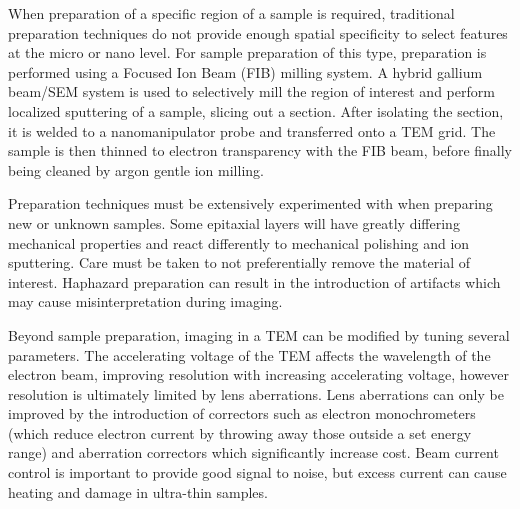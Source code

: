 When preparation of a specific region of a sample is required, traditional preparation techniques do not provide enough spatial specificity to select features at the micro or nano level.
For sample preparation of this type, preparation is performed using a Focused Ion Beam (FIB) milling system.
A hybrid gallium beam/SEM system is used to selectively mill the region of interest and perform localized sputtering of a sample, slicing out a section.
After isolating the section, it is welded to a nanomanipulator probe and transferred onto a TEM grid.
The sample is then thinned to electron transparency with the FIB beam, before finally being cleaned by argon gentle ion milling.

Preparation techniques must be extensively experimented with when preparing new or unknown samples.
Some epitaxial layers will have greatly differing mechanical properties and react differently to mechanical polishing and ion sputtering.
Care must be taken to not preferentially remove the material of interest.
Haphazard preparation can result in the introduction of artifacts which may cause misinterpretation during imaging.

Beyond sample preparation, imaging in a TEM can be modified by tuning several parameters.
The accelerating voltage of the TEM affects the wavelength of the electron beam, improving resolution with increasing accelerating voltage\cite{Kohl2008}, however resolution is ultimately limited by lens aberrations.
Lens aberrations can only be improved by the introduction of correctors such as electron monochrometers (which reduce electron current by throwing away those outside a set energy range) and aberration correctors which significantly increase cost.
Beam current control is important to provide good signal to noise, but excess current can cause heating and damage in ultra-thin samples.

